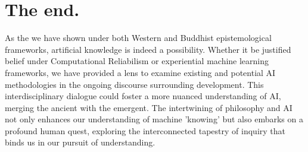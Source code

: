 \documentclass[
	a4paper, %
	10pt, %
	unnumberedsections, %
	twoside, %
]{LTJournalArticle}
\begin{document}
\section{The end.}
As the we have shown under both Western and Buddhist epistemological frameworks, artificial knowledge is indeed a possibility. Whether it be justified belief under Computational Reliabilism or experiential machine learning frameworks, we have provided a lens to examine existing and potential AI methodologies in the ongoing discourse surrounding development. This interdisciplinary dialogue could foster a more nuanced understanding of AI, merging the ancient with the emergent. The intertwining of philosophy and AI not only enhances our understanding of machine 'knowing' but also embarks on a profound human quest, exploring the interconnected tapestry of inquiry that binds us in our pursuit of understanding.
\end{document}
